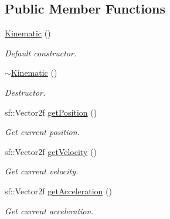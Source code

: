 \subsection*{Public Member Functions}
\begin{DoxyCompactItemize}
\item 
\mbox{\label{class_kinematic_a0265e971c0ac4a847df7d625553becc2}} 
\hyperlink{class_kinematic_a0265e971c0ac4a847df7d625553becc2}{Kinematic} ()
\begin{DoxyCompactList}\small\item\em Default constructor. \end{DoxyCompactList}\item 
\mbox{\label{class_kinematic_ad2e5f972b7bd6e6919473f5fd38cf355}} 
\hyperlink{class_kinematic_ad2e5f972b7bd6e6919473f5fd38cf355}{$\sim$\+Kinematic} ()
\begin{DoxyCompactList}\small\item\em Destructor. \end{DoxyCompactList}\item 
\mbox{\label{class_kinematic_a19b6a52bb1017eb04b8f6d1b349ee00f}} 
sf\+::\+Vector2f \hyperlink{class_kinematic_a19b6a52bb1017eb04b8f6d1b349ee00f}{get\+Position} ()
\begin{DoxyCompactList}\small\item\em Get current position. \end{DoxyCompactList}\item 
\mbox{\label{class_kinematic_a4bddbed2a08c93538ef982b6420f39c6}} 
sf\+::\+Vector2f \hyperlink{class_kinematic_a4bddbed2a08c93538ef982b6420f39c6}{get\+Velocity} ()
\begin{DoxyCompactList}\small\item\em Get current velocity. \end{DoxyCompactList}\item 
\mbox{\label{class_kinematic_a4ff84ca5c4d11dae399ea8abc8b25e69}} 
sf\+::\+Vector2f \hyperlink{class_kinematic_a4ff84ca5c4d11dae399ea8abc8b25e69}{get\+Acceleration} ()
\begin{DoxyCompactList}\small\item\em Get current acceleration. \end{DoxyCompactList}\item 

\end{DoxyCompactItemize}

